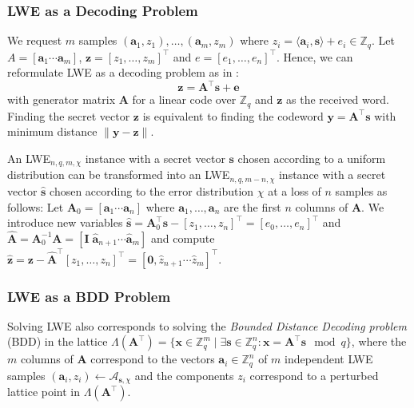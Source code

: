 \documentclass[
  a4paper,  %
  twoside,  %
  bibliography=totoc,
  headsepline,
  cleardoublepage=empty,
  parskip=half,
  draft=false
]{scrbook}
\begin{document}
\subsubsection{LWE as a Decoding Problem}
We request $m$ samples $(\mathbf{a}_1, z_1), \ldots, (\mathbf{a}_m, z_m)$ where $z_i = \langle \mathbf{a}_i, \mathbf{s} \rangle + e_i \in \mathbb{Z}_q$. Let $A = \left[ \mathbf{a}_1 \cdots \mathbf{a}_m\right]$, $\mathbf{z} = \left[z_1, \ldots, z_m\right]^\intercal$ and $e = \left[e_1, \ldots, e_n\right]^\intercal$. Hence, we can reformulate LWE as a decoding problem as in \cite{GJS15}:
\begin{equation} \label{eq:lwe-decoding}
  \mathbf{z} =  \mathbf{A}^\intercal \mathbf{s} + \mathbf{e}
\end{equation} %
with generator matrix $\mathbf{A}$ for a linear code over $\mathbb{Z}_q$ and $\mathbf{z}$ as the received word. Finding the secret vector $\mathbf{z}$ is equivalent to finding the codeword $\mathbf{y} = \mathbf{A}^\intercal\mathbf{s}$ with minimum distance $\| \mathbf{y} - \mathbf{z} \|$. 

An LWE$_{n, q, m, \chi}$ instance with a secret vector $\mathbf{s}$ chosen according to a uniform distribution can be transformed into an LWE$_{n, q, m-n, \chi}$ instance with a secret vector $\hat{\mathbf{s}}$ chosen according to the error distribution $\chi$ at a loss of $n$ samples as follows: Let $\mathbf{A}_0 = \left[ \mathbf{a}_1 \cdots \mathbf{a}_n\right]$ where $\mathbf{a}_1, \ldots, \mathbf{a}_n$ are the first $n$ columns of $\mathbf{A}$. We introduce new variables $\hat{\mathbf{s}} = \mathbf{A}^\intercal_0 \mathbf{s}  - \left[z_1, \ldots, z_n\right]^\intercal = \left[e_0, \ldots, e_n\right]^\intercal$ and $\hat{\mathbf{A}} = \mathbf{A}_0^{-1} \mathbf{A} = \left[\mathbf{I} \; \hat{\mathbf{a}}_{n+1} \cdots \hat{\mathbf{a}}_{m}\right]$ and compute $\hat{\mathbf{z}} = \mathbf{z} -  \hat{\mathbf{A}}^\intercal \left[z_1, \ldots, z_n\right]^\intercal  = \left[\mathbf{0}, \hat{z}_{n+1} \cdots \hat{z}_{m} \right]^\intercal$. 


\subsubsection{LWE as a BDD Problem} \label{sec:lwe-bdd} %
Solving LWE also corresponds to solving the \textit{Bounded Distance Decoding problem} (BDD) in the lattice $\Lambda(\mathbf{A}^\intercal) = \{ \mathbf{x} \in \mathbb{Z}_q^m \mid \exists \mathbf{s} \in \mathbb{Z}_q^n : \mathbf{x} = \mathbf{A}^\intercal \mathbf{s}  \mod q \}$, where the $m$ columns of $\mathbf{A}$ correspond to the vectors $\mathbf{a}_i \in \mathbb{Z}_q^n$ of $m$ independent LWE samples $(\mathbf{a}_i, z_i) \leftarrow \mathcal{A}_{\mathbf{s}, \chi}$ and the components $z_i$ correspond to a perturbed lattice point in $\Lambda(\mathbf{A}^\intercal)$. %
\end{document}
